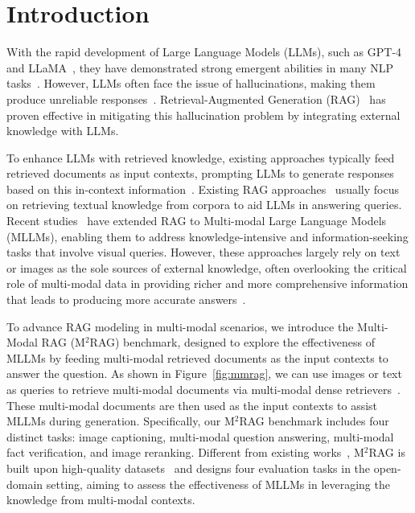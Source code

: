 \section{Introduction}
With the rapid development of Large Language Models (LLMs), such as GPT-4~\cite{openai2023gpt} and LLaMA~\cite{touvron2023llama}, they have demonstrated strong emergent abilities in many NLP tasks~\cite{wei2022emergent, zhao2023survey}. However, LLMs often face the issue of hallucinations, making them produce unreliable responses~\cite{ji2023survey, huang2023survey, shuster2021retrieval}. Retrieval-Augmented Generation (RAG)~\cite{lewis2020retrieval, asai2024reliable, shi2023replug, yao2022react} has proven effective in mitigating this hallucination problem by integrating external knowledge with LLMs.



To enhance LLMs with retrieved knowledge, existing approaches typically feed retrieved documents as input contexts, prompting LLMs to generate responses based on this in-context information~\cite{ram2023context}. Existing RAG approaches~\cite{petroni2021kilt, linra} usually focus on retrieving textual knowledge from corpora to aid LLMs in answering queries. Recent studies~\cite{hu2024mrag, sharifymoghaddam2024unirag} have extended RAG to Multi-modal Large Language Models (MLLMs), enabling them to address knowledge-intensive and information-seeking tasks that involve visual queries. However, these approaches largely rely on text or images as the sole sources of external knowledge, often overlooking the critical role of multi-modal data in providing richer and more comprehensive information that leads to producing more accurate answers~\cite{hu2024mrag, liu2022universal}.

To advance RAG modeling in multi-modal scenarios, we introduce the Multi-Modal RAG (M$^2$RAG) benchmark, designed to explore the effectiveness of MLLMs by feeding multi-modal retrieved documents as the input contexts to answer the question. As shown in Figure~\ref{fig:mmrag}, we can use images or text as queries to retrieve multi-modal documents via multi-modal dense retrievers~\cite{liu2022universal, zhou2024marvel, zhou2024vista}. These multi-modal documents are then used as the input contexts to assist MLLMs during generation. Specifically, our M$^2$RAG benchmark includes four distinct tasks: image captioning, multi-modal question answering, multi-modal fact verification, and image reranking. Different from existing works~\cite{aghajanyan2022cm3, sharifymoghaddam2024unirag}, M$^2$RAG is built upon high-quality datasets~\cite{chang2022webqa, mishra2022factify} and designs four evaluation tasks in the open-domain setting, aiming to assess the effectiveness of MLLMs in leveraging the knowledge from multi-modal contexts.

